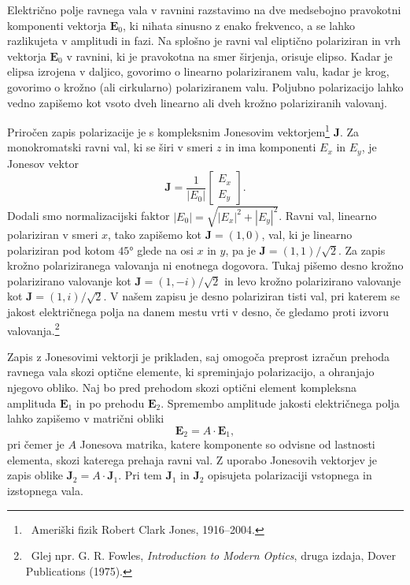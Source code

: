 Električno polje ravnega vala v ravnini razstavimo na dve medsebojno 
pravokotni komponenti vektorja $\mathbf{E}_0$, ki
nihata sinusno z enako frekvenco, a se lahko razlikujeta v amplitudi in fazi. 
Na splošno je ravni val eliptično polariziran in
vrh vektorja $\mathbf E_0$ v ravnini, ki je pravokotna 
na smer širjenja, orisuje elipso. Kadar je elipsa izrojena v daljico,
govorimo o linearno polariziranem valu,
kadar je krog, govorimo o krožno (ali cirkularno) polariziranem valu. 
Poljubno polarizacijo lahko vedno zapišemo kot vsoto dveh linearno ali dveh 
krožno polariziranih valovanj. 

Priročen zapis polarizacije je s kompleksnim Jonesovim 
vektorjem\footnote{~Ameriški fizik Robert Clark Jones, 1916--2004.}
$\mathbf{J}$. Za monokromatski ravni val, ki se širi v smeri $z$ in ima 
komponenti $E_x$ in $E_y$, je Jonesov vektor
\begin{equation}
\mathbf{J}=\frac{1}{|E_{0}|}\left[\begin{array}{c}
E_{x}\\
E_{y}
\end{array}\right]\!.
\end{equation}
Dodali smo normalizacijski faktor $|E_{0}|=\sqrt{|E_{x}|^{2}+|E_{y}|^{2}}$.
Ravni val, linearno polariziran v smeri $x$, tako zapišemo kot $\mathbf{J}=\left(1,0\right)$,
val, ki je linearno polariziran pod kotom $\ang{45}$ glede na osi
$x$ in $y$, pa je $\mathbf{J}=\left(1,1\right)/\sqrt{2}$.
Za zapis krožno polariziranega valovanja ni enotnega dogovora. Tukaj pišemo
desno krožno polarizirano valovanje kot 
$\mathbf{J}=\left(1,-i\right)/\sqrt{2}$ in
levo krožno polarizirano valovanje kot $\mathbf{J}=\left(1,i\right)/\sqrt{2}$.
V našem zapisu je desno polariziran tisti val, pri katerem se jakost električnega
polja na danem mestu vrti v desno, če gledamo proti izvoru valovanja.\footnote{~Glej 
npr. G. R. Fowles, {\it Introduction to Modern Optics}, druga izdaja, Dover Publications (1975).}

Zapis z Jonesovimi vektorji je prikladen, saj omogoča preprost izračun
prehoda ravnega vala skozi optične elemente, ki spreminjajo polarizacijo,
a ohranjajo njegovo obliko. Naj bo pred prehodom skozi optični element kompleksna
amplituda $\mathbf{E}_1$ in po prehodu $\mathbf{E}_2$. Spremembo amplitude 
jakosti električnega polja lahko zapišemo v matrični obliki
\begin{equation}
\mathbf{E}_{2}=A\cdot\mathbf{E}_{1},
\end{equation}
pri čemer je $A$ Jonesova matrika, katere komponente so odvisne od
lastnosti elementa, skozi katerega prehaja ravni val. 
Z uporabo Jonesovih vektorjev je zapis oblike $\mathbf{J}_{2}=A\cdot\mathbf{J}_{1}$. Pri tem
$\mathbf{J}_{1}$ in $\mathbf{J}_{2}$ opisujeta polarizaciji vstopnega in izstopnega vala. 

